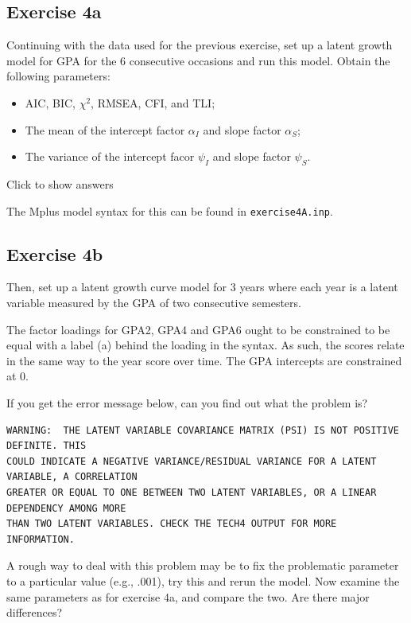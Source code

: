 \documentclass[
]{book}
\providecommand{\tightlist}{%
  \setlength{\itemsep}{0pt}\setlength{\parskip}{0pt}}
\begin{document}
\hypertarget{exercise-4a}{%
\subsection{Exercise 4a}\label{exercise-4a}}

Continuing with the data used for the previous exercise, set up a latent growth model for GPA for the 6 consecutive occasions and run this model. Obtain the following parameters:

\begin{itemize}
\tightlist
\item
  AIC, BIC, \(\chi^{2}\), RMSEA, CFI, and TLI;
\item
  The mean of the intercept factor \(\alpha_{I}\) and slope factor \(\alpha_{S}\);
\item
  The variance of the intercept facor \(\psi_{I}\) and slope factor \(\psi_{S}\).
\end{itemize}

Click to show answers

The Mplus model syntax for this can be found in \texttt{exercise4A.inp}.

\hypertarget{exercise-4b}{%
\subsection{Exercise 4b}\label{exercise-4b}}

Then, set up a latent growth curve model for 3 years where each year is a latent variable measured by the GPA of two consecutive semesters.

The factor loadings for GPA2, GPA4 and GPA6 ought to be constrained to be equal with a label (a) behind the loading in the syntax. As such, the scores relate in the same way to the year score over time. The GPA intercepts are constrained at 0.

If you get the error message below, can you find out what the problem is?

\begin{verbatim}
WARNING:  THE LATENT VARIABLE COVARIANCE MATRIX (PSI) IS NOT POSITIVE DEFINITE. THIS 
COULD INDICATE A NEGATIVE VARIANCE/RESIDUAL VARIANCE FOR A LATENT VARIABLE, A CORRELATION 
GREATER OR EQUAL TO ONE BETWEEN TWO LATENT VARIABLES, OR A LINEAR DEPENDENCY AMONG MORE 
THAN TWO LATENT VARIABLES. CHECK THE TECH4 OUTPUT FOR MORE INFORMATION. 
\end{verbatim}

A rough way to deal with this problem may be to fix the problematic parameter to a particular value (e.g., .001), try this and rerun the model. Now examine the same parameters as for exercise 4a, and compare the two. Are there major differences?
\end{document}
